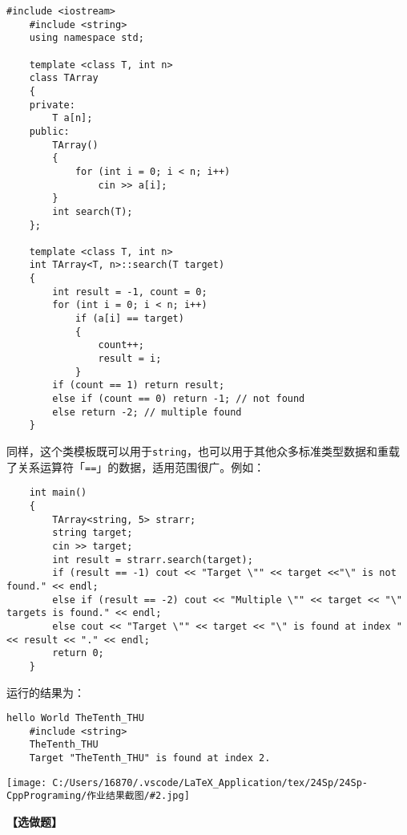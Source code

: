 \documentclass[10pt, a4paper, oneside, fontset=none]{ctexart}
\theoremstyle{plain}
\theoremstyle{definition}
\newcommand{\prtsc}[2][14]{\begin{center}
	\texttt{[image: C:/Users/16870/.vscode/LaTeX\_Application/tex/24Sp/24Sp-CppPrograming/作业结果截图/\#2.jpg]}
	\vspace{-1em}
\end{center}}
\begin{document}
\begin{lstlisting}[style=answer]
	#include <iostream>
	#include <string>
	using namespace std;
	
	template <class T, int n>
	class TArray
	{
	private:
		T a[n];
	public:
		TArray()
		{
			for (int i = 0; i < n; i++)
				cin >> a[i];
		}
		int search(T);
	};
	
	template <class T, int n>
	int TArray<T, n>::search(T target)
	{
		int result = -1, count = 0;
		for (int i = 0; i < n; i++)
			if (a[i] == target)
			{
				count++;
				result = i;
			}
		if (count == 1) return result;
		else if (count == 0) return -1; // not found
		else return -2; // multiple found
	}
\end{lstlisting}
同样，这个类模板既可以用于\texttt{string}，也可以用于其他众多标准类型数据和重载了关系运算符「\texttt{==}」的数据，适用范围很广。例如：
\begin{lstlisting}
	int main()
	{
		TArray<string, 5> strarr;
		string target;
		cin >> target;
		int result = strarr.search(target);
		if (result == -1) cout << "Target \"" << target <<"\" is not found." << endl;
		else if (result == -2) cout << "Multiple \"" << target << "\" targets is found." << endl;
		else cout << "Target \"" << target << "\" is found at index " << result << "." << endl;
		return 0;
	}
\end{lstlisting}
运行的结果为：
\begin{lstlisting}[style=output]
	hello World TheTenth_THU
	#include <string>
	TheTenth_THU
	Target "TheTenth_THU" is found at index 2.
\end{lstlisting}
\prtsc{12-02}

\normalfont
\newpage
\noindent\textbf{\Large\wen 【选做题】}
\end{document}
